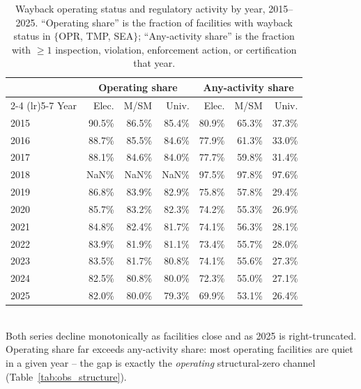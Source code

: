\begin{table}[htbp]
\centering
\small
\caption{Wayback operating status and regulatory activity by year, 2015--2025. ``Operating share'' is the fraction of facilities with wayback status in $\{$OPR, TMP, SEA$\}$; ``Any-activity share'' is the fraction with $\geq 1$ inspection, violation, enforcement action, or certification that year.}
\label{tab:operating_by_year}
\begin{tabular}{l rrr rrr}
\toprule
  & \multicolumn{3}{c}{Operating share} & \multicolumn{3}{c}{Any-activity share} \\
\cmidrule(lr){2-4} \cmidrule(lr){5-7}
Year & Elec. & M/SM & Univ. & Elec. & M/SM & Univ. \\
\midrule
2015 & 90.5\% & 86.5\% & 85.4\% & 80.9\% & 65.3\% & 37.3\% \\
2016 & 88.7\% & 85.5\% & 84.6\% & 77.9\% & 61.3\% & 33.0\% \\
2017 & 88.1\% & 84.6\% & 84.0\% & 77.7\% & 59.8\% & 31.4\% \\
2018 & NaN\% & NaN\% & NaN\% & 97.5\% & 97.8\% & 97.6\% \\
2019 & 86.8\% & 83.9\% & 82.9\% & 75.8\% & 57.8\% & 29.4\% \\
2020 & 85.7\% & 83.2\% & 82.3\% & 74.2\% & 55.3\% & 26.9\% \\
2021 & 84.8\% & 82.4\% & 81.7\% & 74.1\% & 56.3\% & 28.1\% \\
2022 & 83.9\% & 81.9\% & 81.1\% & 73.4\% & 55.7\% & 28.0\% \\
2023 & 83.5\% & 81.7\% & 80.8\% & 74.1\% & 55.6\% & 27.3\% \\
2024 & 82.5\% & 80.8\% & 80.0\% & 72.3\% & 55.0\% & 27.1\% \\
2025 & 82.0\% & 80.0\% & 79.3\% & 69.9\% & 53.1\% & 26.4\% \\
\bottomrule
\end{tabular}
\\[2pt]
{\footnotesize Both series decline monotonically as facilities close and as 2025 is right-truncated. Operating share far exceeds any-activity share: most operating facilities are quiet in a given year -- the gap is exactly the \emph{operating} structural-zero channel (Table~\ref{tab:obs_structure}).}
\end{table}

